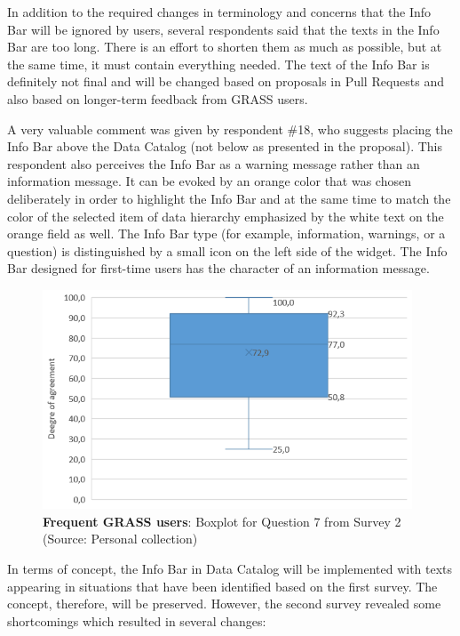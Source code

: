 \documentclass[a4paper,10pt,twoside]{article}
\begin{document}
\noindent In addition to the required changes in terminology and concerns that the Info Bar will be ignored by users, several respondents said that the texts in the Info Bar are too long. There is an effort to shorten them as much as possible, but at the same time, it must contain everything needed. The text of the Info Bar is definitely not final and will be changed based on proposals in Pull Requests and also based on longer-term feedback from GRASS users.

A very valuable comment was given by respondent \#18, who suggests placing the Info Bar above the Data Catalog (not below as presented in the proposal). This respondent also perceives the Info Bar as a warning message rather than an information message. It can be evoked by an orange color that was chosen deliberately in order to highlight the Info Bar and at the same time to match the color of the selected item of data hierarchy emphasized by the white text on the orange field as well. The Info Bar type (for example, information, warnings, or a question) is distinguished by a small icon on the left side of the widget. The Info Bar designed for first-time users has the character of an information message.

\vspace{0.3cm}
\begin{figure}[hbt!] 
\begin{center}
\includegraphics[width=11cm]{../surveys/analyzed_data/survey2_question7_boxplot_group2.png} 
\caption[\textbf{Frequent GRASS users}: Boxplot for Question 7 from Survey 2]{\textbf{Frequent GRASS users}: Boxplot for Question 7 from Survey 2 (Source: Personal collection)}
\label{fig:survey2_question7_boxplot_group2}
\end{center}
\end{figure}

\noindent In terms of concept, the Info Bar in Data Catalog will be implemented with texts appearing in situations that have been identified based on the first survey. The concept, therefore, will be preserved. However, the second survey revealed some shortcomings which resulted in several changes:
\end{document}
